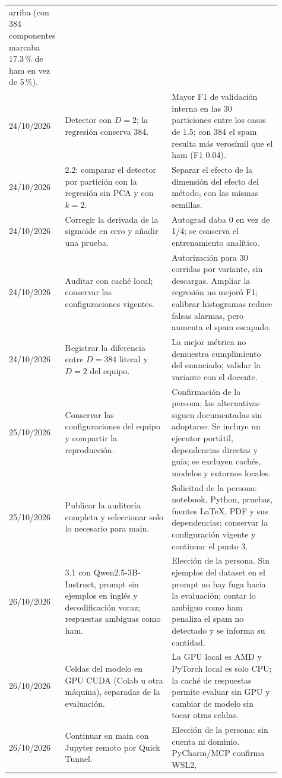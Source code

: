 \documentclass[11pt,letterpaper]{article}
\renewcommand{\_}{\originalunderscore\allowbreak}
\begin{document}
\begin{longtable}{p{0.14\linewidth}p{0.38\linewidth}p{0.39\linewidth}}
arriba (con 384 componentes marcaba 17.3\,\% de ham en vez de 5\,\%).\\
24/10/2026 & Detector con $D=2$; la regresión conserva 384. & Mayor F1 de
validación interna en las 30 particiones entre los casos de 1.5; con 384 el
spam resulta más verosímil que el ham (F1 0.04).\\
24/10/2026 & 2.2: comparar el detector por partición con la regresión sin PCA
y con $k=2$. & Separar el efecto de la dimensión del efecto del método, con
las mismas semillas.\\
24/10/2026 & Corregir la derivada de la sigmoide en cero y añadir una prueba. &
Autograd daba 0 en vez de 1/4; se conserva el entrenamiento analítico.\\
24/10/2026 & Auditar con caché local; conservar las configuraciones vigentes. &
Autorización para 30 corridas por variante, sin descargas. Ampliar la
regresión no mejoró F1; calibrar histogramas reduce falsas alarmas, pero
aumenta el spam escapado.\\
24/10/2026 & Registrar la diferencia entre $D=384$ literal y $D=2$ del equipo. &
La mejor métrica no demuestra cumplimiento del enunciado; validar la
variante con el docente.\\
25/10/2026 & Conservar las configuraciones del equipo y compartir la reproducción. &
Confirmación de la persona; las alternativas siguen documentadas sin
adoptarse. Se incluye un ejecutor portátil, dependencias directas y guía;
se excluyen cachés, modelos y entornos locales.\\
25/10/2026 & Publicar la auditoría completa y seleccionar solo lo necesario para main. &
Solicitud de la persona: notebook, Python, pruebas, fuentes LaTeX, PDF y
sus dependencias; conservar la configuración vigente y continuar el punto 3.\\
26/10/2026 & 3.1 con Qwen2.5-3B-Instruct, prompt sin ejemplos en inglés y
decodificación voraz; respuestas ambiguas como ham. & Elección de la persona.
Sin ejemplos del dataset en el prompt no hay fuga hacia la evaluación; contar
lo ambiguo como ham penaliza el spam no detectado y se informa su cantidad.\\
26/10/2026 & Celdas del modelo en GPU CUDA (Colab u otra máquina), separadas
de la evaluación. & La GPU local es AMD y PyTorch local es solo CPU; la caché
de respuestas permite evaluar sin GPU y cambiar de modelo sin tocar otras
celdas.\\
26/10/2026 & Continuar en main con Jupyter remoto por Quick Tunnel. &
Elección de la persona: sin cuenta ni dominio. PyCharm/MCP confirma WSL2,

\end{longtable}
\end{document}
